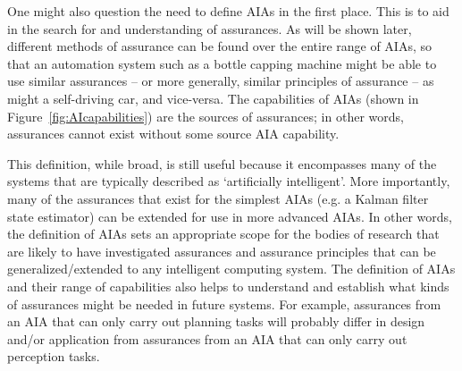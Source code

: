     One might also question the need to define AIAs in the first place. This is to aid in the search for and understanding of assurances. As will be shown later, different methods of assurance can be found over the entire range of AIAs, so that an automation system such as a bottle capping machine might be able to use similar assurances -- or more generally, similar principles of assurance -- as might a self-driving car, and vice-versa. The capabilities of AIAs (shown in Figure~\ref{fig:AIcapabilities}) are the sources of assurances; in other words, assurances cannot exist without some source AIA capability.

    This definition, while broad, is still useful because it encompasses many of the systems that are typically described as `artificially intelligent'. More importantly, many of the assurances that exist for the simplest AIAs (e.g. a Kalman filter state estimator) can be extended for use in more advanced AIAs. In other words, the definition of AIAs sets an appropriate scope for the bodies of research that are likely to have investigated assurances and assurance principles that can be generalized/extended to any intelligent computing system. The definition of AIAs and their range of capabilities also helps to understand and establish what kinds of assurances might be needed in future systems. For example, assurances from an AIA that can only carry out planning tasks will probably differ in design and/or application from assurances from an AIA that can only carry out perception tasks. 
